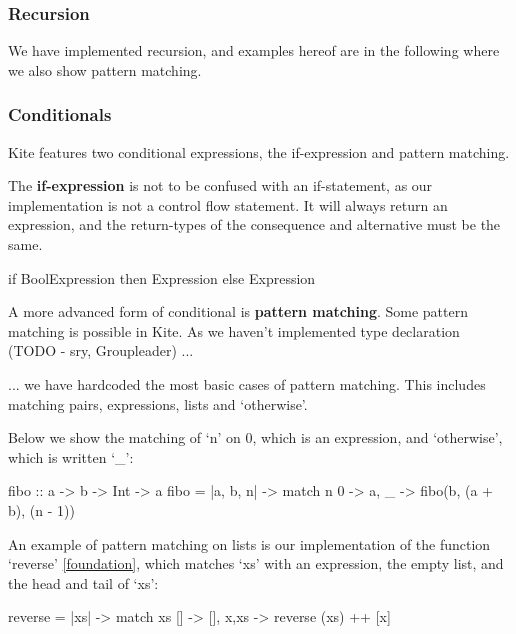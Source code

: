 \subsubsection{Recursion}

We have implemented recursion, and examples hereof are in the following where we also show pattern matching.

\subsubsection{Conditionals}

Kite features two conditional expressions, the if-expression and pattern matching.



The \textbf{if-expression} is not to be confused with an if-statement, as our implementation is not a control flow statement. It will always return an expression, and the return-types of the consequence and alternative must be the same.


\begin{kite}
  
if BoolExpression then Expression else Expression
\end{kite}


A more advanced form of conditional is \textbf{pattern matching}. Some pattern matching is possible in Kite. As we haven't implemented type declaration (TODO - sry, Groupleader) ...

... we have hardcoded the most basic cases of pattern matching. This includes matching pairs, expressions, lists and `otherwise'.


Below we show the matching of `n' on 0, which is an expression, and `otherwise', which is written `\_':
\begin{kite}

fibo :: a -> b -> Int -> a
fibo = |a, b, n| -> {
    match n {
    0 -> a,
    _ -> fibo(b, (a + b), (n - 1))
    }
}
\end{kite}

An example of pattern matching on lists is our implementation of the function `reverse' \ref{foundation}, which matches `xs' with an expression, the empty list, and the head and tail of `xs':

\begin{kite}

reverse = |xs| -> {
  match xs {
    []    -> [],
    x,xs  -> reverse (xs) ++ [x]
  }
}

\end{kite}

